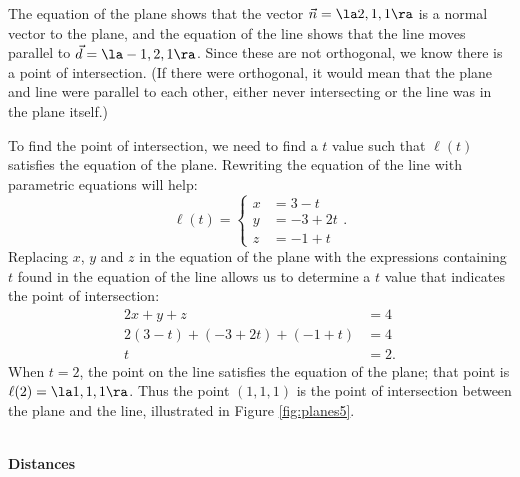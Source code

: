 {The equation of the plane shows that the vector $\vec n = \la 2,1,1\ra$ is a normal vector to the plane, and the equation of the line shows that the line moves parallel to $\vec d = \la -1,2,1\ra$. Since these are not orthogonal, we know there is a point of intersection. (If there were orthogonal, it would mean that the plane and line were parallel to each other, either never intersecting or the line was in the plane itself.)

To find the point of intersection, we need to find a $t$ value such that $\ell(t)$ satisfies the equation of the plane. Rewriting the equation of the line with parametric equations will help:
\[
\ell(t) = \left\{\begin{aligned} x&= 3-t\\ y&=-3+2t\\ z&= -1+t \end{aligned}\right..
\]
Replacing $x$, $y$ and $z$ in the equation of the plane with the expressions containing $t$ found in the equation of the line allows us to determine a $t$ value that indicates the point of intersection:
\begin{align*}
2x+y+z &=4 \\
2(3-t) + (-3+2t) + (-1+t) &= 4 \\
t&=2.
\end{align*}
When $t=2$, the point on the line satisfies the equation of the plane; that point is $\ell(2) = \la 1,1,1\ra$. Thus the point $(1,1,1)$ is the point of intersection between the plane and the line, illustrated in Figure \ref{fig:planes5}.
}\\

\noindent\textbf{\large Distances}\\

